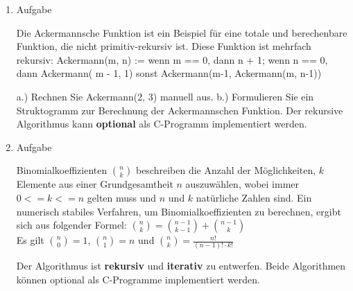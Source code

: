 \documentclass[12pt,a4paper]{scrreprt}
\begin{document}
\begin{enumerate}
\begin{comment}
\begin{lstlisting}
unsigned long long fibi(unsigned char n){
	unsigned long long *f;
	unsigned long long i,r;
	if(n<=14)return (unsigned long long)n;
	f=(unsigned long long*)malloc((n+1)*sizeof(unsigned lon long));
	f[0]=0ULL;//zwei elm reichen statt 
	f[1]=1ULL;
	for(i=2U ; i<=n ; i++){
		f[i]=f[i-1]+f[i-1];
	}
	r=f[n];
	free(f);
	return f[i-1];
}
\end{lstlisting}

\end{comment}

\item Aufgabe %

Die Ackermannsche Funktion ist ein Beispiel für eine totale und berechenbare
Funktion, die nicht primitiv-rekursiv ist. Diese Funktion ist mehrfach rekursiv:
Ackermann(m, n) := wenn m == 0, dann n + 1;
wenn n == 0, dann Ackermann( m - 1, 1)
sonst Ackermann(m-1, Ackermann(m, n-1))

a.) Rechnen Sie Ackermann(2, 3) manuell aus.
b.) Formulieren Sie ein Struktogramm zur Berechnung der Ackermannschen Funktion.
Der rekursive Algorithmus kann \textbf{optional} als C-Programm implementiert werden.

\begin{comment}
\begin{lstlisting}

\end{lstlisting}
\end{comment}


\item Aufgabe %

Binomialkoeffizienten $\binom{n}{k}$ beschreiben die Anzahl der Möglichkeiten, $k$ Elemente aus einer Grundgesamtheit $n$ auszuwählen, wobei immer $0 <= k <= n$ gelten muss und $n$ und $k$ natürliche Zahlen sind. Ein numerisch stabiles Verfahren, um Binomialkoeffizienten zu berechnen, ergibt sich aus folgender Formel:
$\binom{n}{k} = \binom{n-1}{k-1}+\binom{n-1}{k}$ \\
Es gilt $\binom{n}{0}=1$, $\binom{n}{1}=n$ und $\binom{n}{k}=\frac{n!}{(n-1)! \cdot k!}$

Der Algorithmus ist \textbf{rekursiv} und \textbf{iterativ} zu entwerfen. Beide Algorithmen können optional als C-Programme implementiert werden.

\begin{comment}
n ueber k mit einer matrix

iterativ
\begin{tabular}
0 & k	\\
n & 1 & 0 & 0 & 0	\\
  & ... & 1 & 1 & 0	\\
  & 1 & 2
\end{tabular}


\end{comment}
\end{enumerate}
\end{document}
